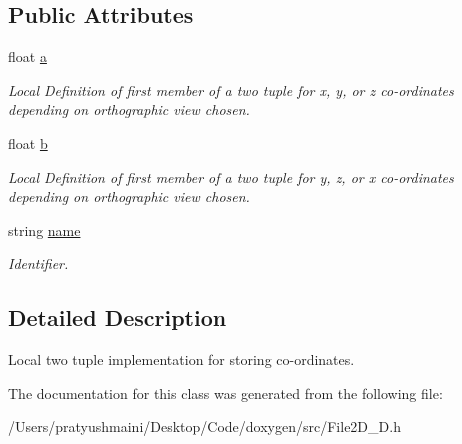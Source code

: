 \subsection*{Public Attributes}
\begin{DoxyCompactItemize}
\item 
\mbox{\label{classvector2_a1bcf9a3148a6f0330e2d6f770d86f0b0}} 
float \mbox{\hyperlink{classvector2_a1bcf9a3148a6f0330e2d6f770d86f0b0}{a}}
\begin{DoxyCompactList}\small\item\em Local Definition of first member of a two tuple for x, y, or z co-\/ordinates depending on orthographic view chosen. \end{DoxyCompactList}\item 
\mbox{\label{classvector2_ae72bf67101a5a1e8fa2a7fc418f81a20}} 
float \mbox{\hyperlink{classvector2_ae72bf67101a5a1e8fa2a7fc418f81a20}{b}}
\begin{DoxyCompactList}\small\item\em Local Definition of first member of a two tuple for y, z, or x co-\/ordinates depending on orthographic view chosen. \end{DoxyCompactList}\item 
\mbox{\label{classvector2_a64b7967b0d8141acdfa7444d53b0dd84}} 
string \mbox{\hyperlink{classvector2_a64b7967b0d8141acdfa7444d53b0dd84}{name}}
\begin{DoxyCompactList}\small\item\em Identifier. \end{DoxyCompactList}\end{DoxyCompactItemize}


\subsection{Detailed Description}
Local two tuple implementation for storing co-\/ordinates. 

The documentation for this class was generated from the following file\+:\begin{DoxyCompactItemize}
\item 
/\+Users/pratyushmaini/\+Desktop/\+Code/doxygen/src/File2\+D\+\_\+D.\+h\end{DoxyCompactItemize}
